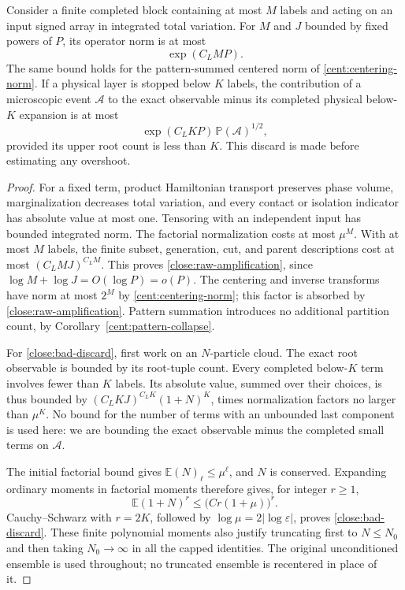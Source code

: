 \begin{lemma}
\label{close:amplification}
Consider a finite completed block containing at most $M$ labels
and acting on an input signed array in integrated total variation.
For $M$ and $J$ bounded by fixed powers of $P$, its operator norm
is at most
\begin{equation}\label{close:raw-amplification}
 \exp(C_LMP).
\end{equation}
The same bound holds for the pattern-summed centered norm of
\eqref{cent:centering-norm}. If a physical layer is stopped below
$K$ labels, the contribution of a
microscopic event $\mathcal A$ to the exact observable minus its
completed physical below-$K$ expansion is at most
\begin{equation}\label{close:bad-discard}
 \exp(C_LKP)\,\mathbb P(\mathcal A)^{1/2},
\end{equation}
provided its upper root count is less than $K$. This discard is
made before estimating any overshoot.
\end{lemma}
\begin{proof}
For a fixed term, product Hamiltonian transport preserves phase
volume, marginalization decreases total variation, and every
contact or isolation indicator has absolute value at most one.
Tensoring with an independent input has bounded integrated norm.
The factorial normalization costs at most $\mu^M$. With at most
$M$ labels, the finite subset, generation, cut, and parent
descriptions cost at most $(C_L M J)^{C_LM}$. This proves
\eqref{close:raw-amplification}, since
$\log M+\log J=O(\log P)=o(P)$.
The centering and inverse transforms have norm at most $2^M$
by \eqref{cent:centering-norm}; this factor is absorbed by
\eqref{close:raw-amplification}. Pattern summation introduces no
additional partition count, by Corollary~\ref{cent:pattern-collapse}.

For \eqref{close:bad-discard}, first work on an $N$-particle
cloud. The exact root observable is bounded by its root-tuple
count. Every completed below-$K$ term involves fewer than $K$
labels. Its absolute value, summed over their choices, is thus
bounded by $(C_LKJ)^{C_LK}(1+N)^K$, times normalization factors
no larger than $\mu^K$. No bound for the number of terms with
an unbounded last component is used here: we are bounding the
exact observable minus the completed small terms on $\mathcal A$.

The initial factorial bound gives
$\mathbb E(N)_\ell\leq\mu^\ell$, and $N$ is conserved. Expanding
ordinary moments in factorial moments therefore gives, for
integer $r\geq1$,
\[
 \mathbb E(1+N)^r\leq \bigl(Cr(1+\mu)\bigr)^r.
\]
Cauchy--Schwarz with $r=2K$, followed by
$\log\mu=2|\log\varepsilon|$, proves
\eqref{close:bad-discard}. These finite polynomial moments also
justify truncating first to $N\leq N_0$ and then taking
$N_0\to\infty$ in all the capped identities. The original
unconditioned ensemble is used throughout; no truncated ensemble
is recentered in place of it.
\end{proof}

